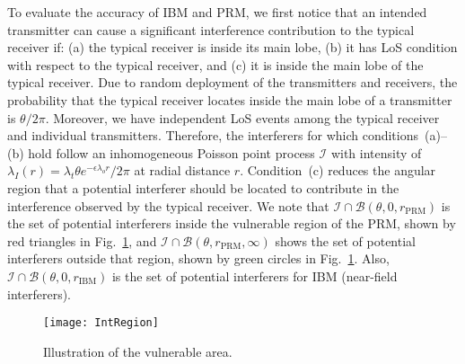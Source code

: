 \documentclass[12pt, draftclsnofoot, onecolumn]{IEEEtran}
\begin{document}
%


To evaluate the accuracy of IBM and PRM, we first notice that an intended transmitter can cause a significant interference contribution to the typical receiver if: (a) the typical receiver is inside its main lobe, (b) it has LoS condition with respect to the typical receiver, and (c) it is inside the main lobe of the typical receiver.
Due to random deployment of the transmitters and receivers, the probability that the typical receiver locates inside the main lobe of a transmitter is $\theta/2 \pi$. Moreover, we have independent LoS events among the typical receiver and individual transmitters. Therefore, the interferers for which conditions~(a)--(b) hold follow an inhomogeneous Poisson point process $\mathcal{I}$ with intensity of $\lambda_I \left( r \right) = \lambda_t \theta e^{-\epsilon\lambda_o r} / 2\pi$ at radial distance $r$. Condition~(c) reduces the angular region that a potential interferer should be located to contribute in the interference observed by the typical receiver.
We note that $\mathcal{I} \cap \mathcal{B}(\theta,0,r_{\mathrm{PRM}})$ is the set of potential interferers inside the vulnerable region of the PRM, shown by red triangles in Fig.~\ref{fig: IntRegion}, and $\mathcal{I} \cap \mathcal{B}(\theta,r_{\mathrm{PRM}},\infty)$ shows the set of potential interferers outside that region, shown by green circles in Fig.~\ref{fig: IntRegion}. Also, $\mathcal{I} \cap \mathcal{B}(\theta,0,r_{\mathrm{IBM}})$ is the set of potential interferers for IBM (near-field interferers).
\begin{figure}[!t]
  \centering
  \texttt{[image: IntRegion]}\\

\vspace{1mm}
  \caption{Illustration of the vulnerable area.}\label{fig: IntRegion}
\vspace{-7mm}
\end{figure}
%
\end{document}

